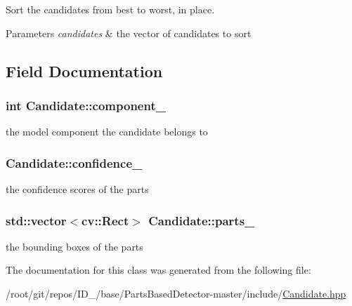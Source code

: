 \-Sort the candidates from best to worst, in place. 


\begin{DoxyParams}{\-Parameters}
{\em candidates} & the vector of candidates to sort \\
\hline
\end{DoxyParams}


\subsection{\-Field \-Documentation}
\hypertarget{classCandidate_a7866513384d74055891a237a524798ab}{
\subsubsection[{component\-\_\-}]{\setlength{\rightskip}{0pt plus 5cm}int {\bf \-Candidate\-::component\-\_\-}}}\label{classCandidate_a7866513384d74055891a237a524798ab}


the model component the candidate belongs to 

\hypertarget{classCandidate_a31785654c1d01cda9cadf93e919b30f1}{
\subsubsection[{confidence\-\_\-}]{ {\bf \-Candidate\-::confidence\-\_\-}}}\label{classCandidate_a31785654c1d01cda9cadf93e919b30f1}


the confidence scores of the parts 

\hypertarget{classCandidate_aa0e3d40adf86bff2e99f3e4234ce674b}{
\subsubsection[{parts\-\_\-}]{\setlength{\rightskip}{0pt plus 5cm}std\-::vector$<$cv\-::\-Rect$>$ {\bf \-Candidate\-::parts\-\_\-}}}\label{classCandidate_aa0e3d40adf86bff2e99f3e4234ce674b}


the bounding boxes of the parts 



\-The documentation for this class was generated from the following file\-:\begin{DoxyCompactItemize}
\item 
/root/git/repos/\-I\-D\-\_/base/\-Parts\-Based\-Detector-\/master/include/\hyperlink{Candidate_8hpp}{\-Candidate.\-hpp}\end{DoxyCompactItemize}
